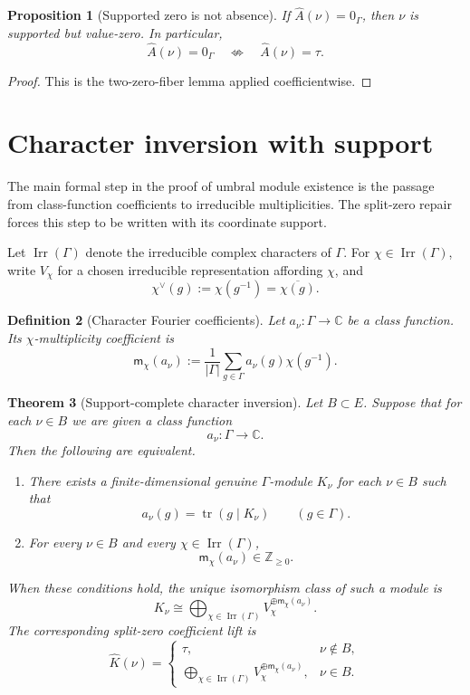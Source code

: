 \documentclass[11pt]{article}
\newtheorem{theorem}{Theorem}[section]
\newtheorem{proposition}[theorem]{Proposition}
\newtheorem{definition}[theorem]{Definition}
\newcommand{\ZZ}{\mathbb Z}
\newcommand{\CC}{\mathbb C}
\newcommand{\Irr}{\operatorname{Irr}}
\newcommand{\tr}{\operatorname{tr}}
\begin{document}
\begin{proposition}[Supported zero is not absence]
If \(\widehat A(\nu)=0_\Gamma\), then \(\nu\) is supported but value-zero.  In particular,
\[
\widehat A(\nu)=0_\Gamma
\quad\not\Longleftrightarrow\quad
\widehat A(\nu)=\tau.
\]
\end{proposition}

\begin{proof}
This is the two-zero-fiber lemma applied coefficientwise.
\end{proof}

\section{Character inversion with support}

The main formal step in the proof of umbral module existence is the passage from class-function coefficients to irreducible multiplicities.  The split-zero repair forces this step to be written with its coordinate support.

Let \(\Irr(\Gamma)\) denote the irreducible complex characters of \(\Gamma\).  For \(\chi\in\Irr(\Gamma)\), write \(V_\chi\) for a chosen irreducible representation affording \(\chi\), and
\[
\chi^\vee(g):=\chi(g^{-1})=\overline{\chi(g)}.
\]

\begin{definition}[Character Fourier coefficients]
Let \(a_\nu:\Gamma\to\CC\) be a class function.  Its \(\chi\)-multiplicity coefficient is
\[
\mathsf m_\chi(a_\nu):=\frac1{|\Gamma|}\sum_{g\in\Gamma}a_\nu(g)\chi(g^{-1}).
\]
\end{definition}

\begin{theorem}[Support-complete character inversion]
Let \(B\subset E\).  Suppose that for each \(\nu\in B\) we are given a class function
\[
a_\nu:\Gamma\to\CC.
\]
Then the following are equivalent.

\begin{enumerate}[label=(\roman*)]
\item There exists a finite-dimensional genuine \(\Gamma\)-module \(K_\nu\) for each \(\nu\in B\) such that
\[
a_\nu(g)=\tr(g\mid K_\nu)
\qquad(g\in\Gamma).
\]
\item For every \(\nu\in B\) and every \(\chi\in\Irr(\Gamma)\),
\[
\mathsf m_\chi(a_\nu)\in\ZZ_{\ge0}.
\]
\end{enumerate}

When these conditions hold, the unique isomorphism class of such a module is
\[
K_\nu\cong\bigoplus_{\chi\in\Irr(\Gamma)}V_\chi^{\oplus\mathsf m_\chi(a_\nu)}.
\]
The corresponding split-zero coefficient lift is
\[
\widehat K(\nu)=
\begin{cases}
\tau,&\nu\notin B,\\
\displaystyle\bigoplus_{\chi\in\Irr(\Gamma)}V_\chi^{\oplus\mathsf m_\chi(a_\nu)},&\nu\in B.
\end{cases}
\]
\end{theorem}
\end{document}
